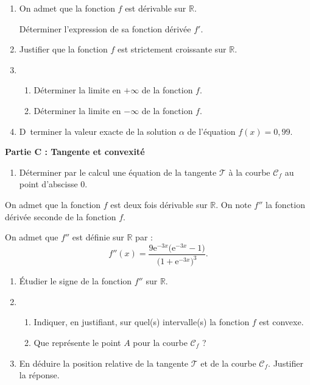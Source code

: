 \begin{enumerate}
	\item On admet que la fonction $f$ est dérivable sur $\mathbb{R}$.
	
	Déterminer l'expression de sa fonction dérivée $f'$.
	\item Justifier que la fonction $f$ est strictement croissante sur $\mathbb{R}$.
	\item 
	\begin{enumerate}
		\item Déterminer la limite en $+\infty$ de la fonction $f$.
		\item Déterminer la limite en $-\infty$ de la fonction $f$.
	\end{enumerate}
	\item D~terminer la valeur exacte de la solution $\alpha$ de l'équation $f(x) = 0,99$.
\end{enumerate}

\smallskip

\textbf{Partie C : Tangente et convexité}

\smallskip

\begin{enumerate}
	\item Déterminer par le calcul une équation de la tangente $\mathcal{T}$ à la courbe $\mathcal{C}_f$ au point d'abscisse $0$.
\end{enumerate}

On admet que la fonction $f$ est deux fois dérivable sur $\mathbb{R}$. On note $f''$ la fonction dérivée seconde de la fonction $f$.

On admet que $f''$ est définie sur $\mathbb{R}$ par : \[ f''(x)=\frac{9\text{e}^{-3x}\big(\text{e}^{-3x}-1\big)}{\big(1+\text{e}^{-3x}\big)^3}. \]
%
\begin{enumerate}[resume]
	\item Étudier le signe de la fonction $f''$ sur $\mathbb{R}$.
	\item 
	\begin{enumerate}
		\item Indiquer, en justifiant, sur quel(s) intervalle(s) la fonction $f$ est convexe.
		\item Que représente le point $A$ pour la courbe $\mathcal{C}_f$ ?
	\end{enumerate}
	\item En déduire la position relative de la tangente $\mathcal{T}$ et de la courbe $\mathcal{C}_f$. Justifier la réponse. 
\end{enumerate}
